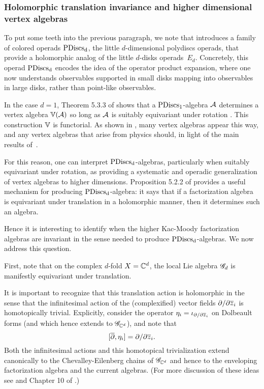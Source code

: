 \subsubsection{Holomorphic translation invariance and higher dimensional vertex algebras}

To put some teeth into the previous paragraph,
we note that \cite{CG1} introduces a family of colored operads ${\rm PDiscs_d}$, the little $d$-dimensional polydiscs operads,
that provide a holomorphic analog of the little $d$-disks operads~$E_d$.
Concretely, this operad ${\rm PDiscs_d}$ encodes the idea of the operator product expansion, 
where one now understands observables supported in small disks mapping into observables in large disks, rather than point-like observables.

In the case $d=1$, Theorem 5.3.3 of \cite{CG1} shows that a ${\rm PDiscs_1}$-algebra $\cA$ determines a vertex algebra $\VV(\cA)$ so long as $\cA$ is suitably equivariant under rotation .
This construction $\VV$ is functorial.
As shown in \cite{CG1}, many vertex algebras appear this way, and any vertex algebras that arise from physics should, in light of the main results of~\cite{CG1,CG2}.

For this reason, one can interpret ${\rm PDiscs_d}$-algebras, particularly when suitably equivariant under rotation, as providing a systematic and operadic generalization of vertex algebras to higher dimensions. 
Proposition 5.2.2 of \cite{CG1} provides a useful mechanism for producing ${\rm PDiscs_d}$-algebra: 
it says that if a factorization algebra is equivariant under translation in a holomorphic manner, then it determines such an algebra.

Hence it is interesting to identify when the higher Kac-Moody factorization algebras are invariant in the sense needed to produce ${\rm PDiscs_d}$-algebras.
We now address this question.

First, note that on the complex $d$-fold $X = \CC^d$, 
the local Lie algebra $\sG_{d}$ is manifestly equivariant under translation.

It is important to recognize that this translation action is holomorphic in the sense that the infinitesimal action of the (complexified) vector fields $\partial/\partial \Bar{z}_i$ is homotopically trivial.
Explicitly, consider the operator $\eta_i = \iota_{\partial/\partial \Bar{z}_i}$ on Dolbeault forms
(and which hence extends to $\sG_{\CC^d}$), and
note that
\[
[\dbar, \eta_i] = \partial/\partial \Bar{z}_i.
\]
Both the infinitesimal actions and this homotopical trivialization extend canonically to the Chevalley-Eilenberg chains of $\sG_{\CC^d}$ and hence to the enveloping factorization algebra and the current algebras.
(For more discussion of these ideas see \cite{BWhol} and Chapter 10 of \cite{CG2}.)

